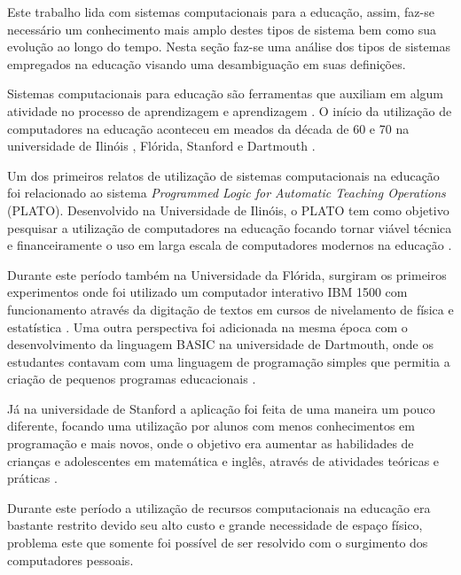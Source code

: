 
Este trabalho lida com sistemas computacionais para a educação, assim, faz-se necessário um conhecimento mais amplo destes tipos de sistema bem como sua evolução ao longo do tempo. Nesta seção faz-se uma análise dos tipos de sistemas empregados na educação visando uma desambiguação em suas definições.

Sistemas computacionais para educação são ferramentas que auxiliam em algum atividade no processo de aprendizagem e aprendizagem \cite{tchounikine11}. O início da utilização de computadores na educação aconteceu em meados da década de 60 e 70 na universidade de Ilinóis \cite{plato}, Flórida, Stanford e Dartmouth \cite{chambers80}.

Um dos primeiros relatos de utilização de sistemas computacionais na educação foi relacionado ao sistema \emph{Programmed Logic for Automatic Teaching Operations} (PLATO). Desenvolvido na Universidade de Ilinóis, o PLATO tem como objetivo pesquisar a utilização de computadores na educação focando tornar viável técnica e financeiramente o uso em larga escala de computadores modernos na educação \cite{plato}.

Durante este período também na Universidade da Flórida, surgiram os primeiros experimentos onde foi utilizado um computador interativo IBM 1500 com funcionamento através da digitação de textos em cursos de nivelamento de física e estatística \cite{chambers80}. Uma outra perspectiva foi adicionada na mesma época com o desenvolvimento da linguagem BASIC na universidade de Dartmouth, onde os estudantes contavam com uma linguagem de programação simples que permitia a criação de pequenos programas educacionais \cite{chambers80}. 

Já na universidade de Stanford a aplicação foi feita de uma maneira um pouco diferente, focando uma utilização por alunos com menos conhecimentos em programação e mais novos, onde o objetivo era aumentar as habilidades de crianças e adolescentes em matemática e inglês, através de atividades teóricas e práticas \cite{chambers80}.

Durante este período a utilização de recursos computacionais na educação era bastante restrito devido seu alto custo e grande necessidade de espaço físico, problema este que somente foi possível de ser resolvido com o surgimento dos computadores pessoais. 

